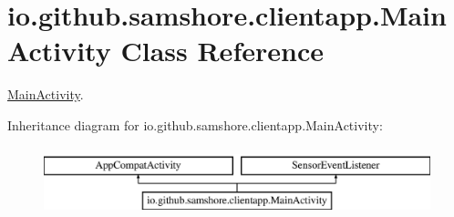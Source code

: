 \hypertarget{classio_1_1github_1_1samshore_1_1clientapp_1_1_main_activity}{}\section{io.\+github.\+samshore.\+clientapp.\+Main\+Activity Class Reference}
\label{classio_1_1github_1_1samshore_1_1clientapp_1_1_main_activity}


\hyperlink{classio_1_1github_1_1samshore_1_1clientapp_1_1_main_activity}{Main\+Activity}.  


Inheritance diagram for io.\+github.\+samshore.\+clientapp.\+Main\+Activity\+:\begin{figure}[H]
\begin{center}
\leavevmode
\includegraphics[height=2.000000cm]{classio_1_1github_1_1samshore_1_1clientapp_1_1_main_activity}
\end{center}
\end{figure}

